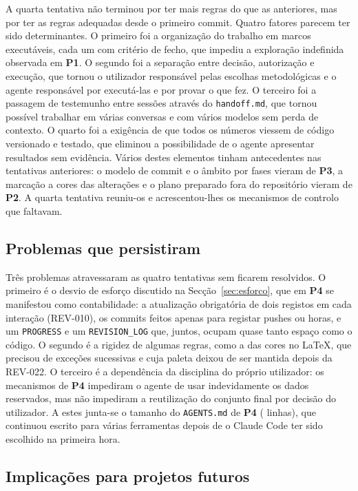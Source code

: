 \documentclass[11pt,a4paper]{article}
\newcommand{\Pum}{\textbf{P1}}
\newcommand{\Pdois}{\textbf{P2}}
\newcommand{\Ptres}{\textbf{P3}}
\newcommand{\Pquatro}{\textbf{P4}}
\begin{document}
A quarta tentativa não terminou por ter mais regras do que as anteriores, mas por ter as regras
adequadas desde o primeiro commit. Quatro fatores parecem ter sido determinantes. O primeiro foi a
organização do trabalho em marcos executáveis, cada um com critério de fecho, que impediu a
exploração indefinida observada em \Pum. O segundo foi a separação entre decisão, autorização e
execução, que tornou o utilizador responsável pelas escolhas metodológicas e o agente responsável
por executá-las e por provar o que fez. O terceiro foi a passagem de testemunho entre sessões
através do \texttt{handoff.md}, que tornou possível trabalhar em várias conversas e com vários
modelos sem perda de contexto. O quarto foi a exigência de que todos os números viessem de código
versionado e testado, que eliminou a possibilidade de o agente apresentar resultados sem
evidência. Vários destes elementos tinham antecedentes nas tentativas anteriores: o modelo de
commit e o âmbito por fases vieram de \Ptres, a marcação a cores das alterações e o plano
preparado fora do repositório vieram de \Pdois. A quarta tentativa reuniu-os e acrescentou-lhes
os mecanismos de controlo que faltavam.

\subsection{Problemas que persistiram}

Três problemas atravessaram as quatro tentativas sem ficarem resolvidos. O primeiro é o desvio de
esforço discutido na Secção~\ref{sec:esforco}, que em \Pquatro{} se manifestou como contabilidade:
a atualização obrigatória de dois registos em cada interação (REV-010), os commits feitos apenas
para registar pushes ou horas, e um \texttt{PROGRESS} e um \texttt{REVISION\_LOG} que, juntos,
ocupam quase tanto espaço como o código. O segundo é a rigidez de algumas regras, como a das cores
no LaTeX, que precisou de exceções sucessivas e cuja paleta deixou de ser mantida depois da
REV-022. O terceiro é a dependência da disciplina do próprio utilizador: os mecanismos de
\Pquatro{} impediram o agente de usar indevidamente os dados reservados, mas não impediram a
reutilização do conjunto final por decisão do utilizador. A estes junta-se o tamanho do
\texttt{AGENTS.md} de \Pquatro{} (\mQuatroAgentsLinhas{} linhas), que continuou escrito para várias
ferramentas depois de o Claude Code ter sido escolhido na primeira hora.

\subsection{Implicações para projetos futuros}\label{sec:licoes}
\end{document}
